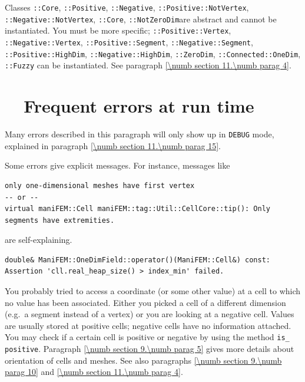 Classes {\small\tt{}::Core}, {\small\tt{}::Positive},
{\small\tt{}::Negative}, {\small\tt{}::Positive::NotVertex},\hfil\break
{\small\tt{}::Negative::NotVertex}, {\small\tt{}::Core},
{\small\tt{}::NotZeroDim}are abstract and cannot be instantiated.
You must be more specific; {\small\tt{}::Positive::Vertex},
{\small\tt{}::Negative::Vertex},\hfil\break
{\small\tt{}::Positive::Segment},
{\small\tt{}::Negative::Segment}, {\small\tt{}::Positive::HighDim},
{\small\tt{}::Negative::HighDim}, {\small\tt{}::ZeroDim},
{\small\tt{}::Connected::OneDim}, {\small\tt{}::Fuzzy}
can be instantiated.
See paragraph \ref{\numb section 11.\numb parag 4}.


\section{~~Frequent errors at run time}\label{\numb section 11.\numb parag 14}

Many errors described in this paragraph will only show up in {\small\tt DEBUG} mode,
explained in paragraph \ref{\numb section 11.\numb parag 15}.

Some errors give explicit messages. For instance, messages like

\begin{Verbatim}[commandchars=\\\{\},formatcom=\small\tt,baselinestretch=0.94]
only one-dimensional meshes have first vertex
-- or --
virtual maniFEM::Cell maniFEM::tag::Util::CellCore::tip(): Only segments have extremities. 
\end{Verbatim}

\noindent are self-explaining.

\begin{Verbatim}[commandchars=\\\{\},formatcom=\small\tt,baselinestretch=0.94]
double& ManiFEM::OneDimField::operator()(ManiFEM::Cell&) const:
Assertion 'cll.real_heap_size() > index_min' failed.
\end{Verbatim}

You probably tried to access a coordinate (or some other value) at a cell to which 
no value has been associated.
Either you picked a cell of a different dimension (e.g.\ a segment instead of a
vertex) or you are looking at a negative cell.
Values are usually stored at positive cells; negative cells have no information attached.
You may check if a certain cell is positive or negative by using the method
{\small\tt is\_\,positive}.
Paragraph \ref{\numb section 9.\numb parag 5} gives more details about orientation of
cells and meshes.
See also paragraphs \ref{\numb section 9.\numb parag 10} and
\ref{\numb section 11.\numb parag 4}.

